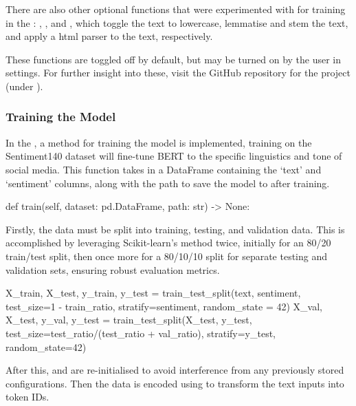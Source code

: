         There are also other optional functions that were experimented with for training in the : , , and , which toggle the text to lowercase, lemmatise and stem the text, and apply a  html parser to the text, respectively.

        These functions are toggled off by default, but may be turned on by the user in settings. For further insight into these, visit the GitHub repository for the project \citep{sentimentanalysistool} (under ).

        \subsubsection{Training the Model}
        In the , a method  for training the model is implemented, training on the Sentiment140 \citep{sentiment140dataset} dataset will fine-tune BERT to the specific linguistics and tone of social media. This function takes in a DataFrame containing the `text' and `sentiment' columns, along with the path to save the model to after training.

        \begin{python}
def train(self, dataset: pd.DataFrame, path: str) -> None:
        \end{python}

        Firstly, the data must be split into training, testing, and validation data. This is accomplished by leveraging Scikit-learn's  method twice, initially for an 80/20 train/test split, then once more for a 80/10/10 split for separate testing and validation sets, ensuring robust evaluation metrics.

        \begin{python}
X_train, X_test, y_train, y_test = train_test_split(text, sentiment, test_size=1 - train_ratio, stratify=sentiment, random_state = 42)
X_val, X_test, y_val, y_test = train_test_split(X_test, y_test, test_size=test_ratio/(test_ratio + val_ratio), stratify=y_test, random_state=42)
        \end{python}

        After this,  and  are re-initialised to avoid interference from any previously stored configurations. Then the data is encoded using  to transform the text inputs into token IDs.

